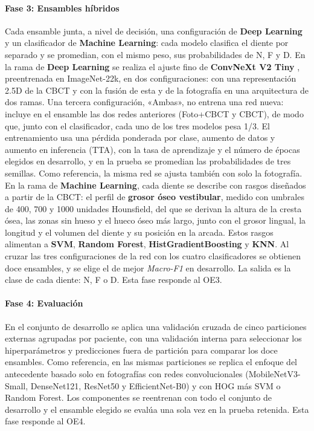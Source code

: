 \documentclass[12pt,a4paper]{article}
\newcommand{\prob}[1]{\textcolor{problema}{\textbf{#1}}}
\newcommand{\sol}[1]{\textcolor{solucion}{\textbf{#1}}}
\newcommand{\prob}[1]{#1}
\newcommand{\sol}[1]{#1}
\begin{document}
\paragraph{Fase 3: Ensambles híbridos}
Cada ensamble junta, a nivel de decisión, una configuración de \sol{Deep
Learning} y un clasificador de \sol{Machine Learning}: cada modelo
clasifica el diente por separado y se promedian, con el mismo peso, sus
probabilidades de N, F y D. En la rama de
\sol{Deep Learning} se realiza el ajuste fino de \sol{ConvNeXt V2 Tiny}
\parencite{woo2023convnextv2}, preentrenada en ImageNet-22k, en dos
configuraciones: con una representación 2.5D de la CBCT y con la fusión
de esta y de la fotografía en una arquitectura de dos ramas. Una tercera
configuración, «Ambas», no entrena una red nueva: incluye en el ensamble
las dos redes anteriores (Foto+CBCT y CBCT), de modo que, junto con el
clasificador, cada uno de los tres modelos pesa 1/3. El entrenamiento usa una pérdida
ponderada por clase, aumento de datos y aumento en inferencia (TTA), con
la tasa de aprendizaje y el número de épocas elegidos en desarrollo, y en
la prueba se promedian las probabilidades de tres semillas. Como
referencia, la misma red se ajusta también con solo la fotografía. En la
rama de \sol{Machine Learning}, cada diente se describe con rasgos
diseñados a partir de la CBCT: el perfil de \prob{grosor óseo
vestibular}, medido con umbrales de 400, 700 y 1000 unidades Hounsfield,
del que se derivan la altura de la cresta ósea, las zonas sin hueso y el
hueco óseo más largo, junto con el grosor lingual, la longitud y el
volumen del diente y su posición en la arcada. Estos rasgos alimentan a
\sol{SVM}, \sol{Random Forest}, \sol{HistGradientBoosting} y \sol{KNN}.
Al cruzar las tres configuraciones de la red con los cuatro
clasificadores se obtienen doce ensambles, y se elige el de mejor
\textit{Macro-F1} en desarrollo. La salida es la clase de cada diente: N,
F o D. Esta fase responde al OE3.

\paragraph{Fase 4: Evaluación}
En el conjunto de desarrollo se aplica una validación cruzada de cinco
particiones externas agrupadas por paciente, con una validación interna
para seleccionar los hiperparámetros y predicciones fuera de partición
para comparar los doce ensambles. Como referencia, en las mismas
particiones se replica el enfoque del antecedente basado solo en
fotografías \parencite{liu2025fdtooth} con redes convolucionales
(MobileNetV3-Small, DenseNet121, ResNet50 y EfficientNet-B0) y con HOG
más SVM o Random Forest. Los componentes se reentrenan con todo el
conjunto de desarrollo y el ensamble elegido se evalúa una sola vez en la
prueba retenida. Esta fase responde al OE4.
\end{document}
